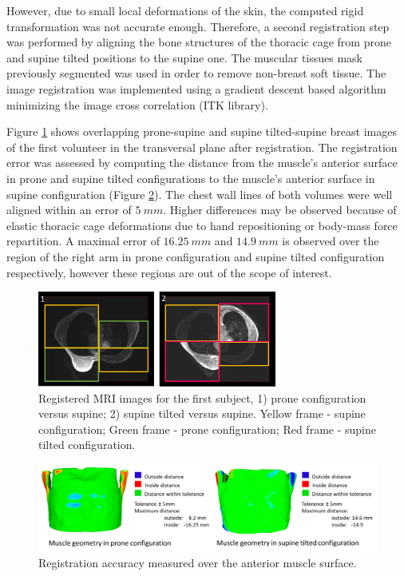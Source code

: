 However, due to small local deformations of the skin, the computed rigid transformation was not accurate enough. Therefore, a second registration step was performed by aligning the bone structures of the thoracic cage from prone and supine tilted positions to the supine one. The muscular tissues mask previously segmented was used in order to remove non-breast soft tissue. The image registration was implemented using a gradient descent based algorithm minimizing the image cross correlation (ITK library).

Figure \ref{fig:patientdataregistered} shows overlapping  prone-supine and supine tilted-supine breast images of the first volunteer in the transversal plane after registration. The registration error was assessed by computing the distance from the muscle's anterior surface in prone and supine tilted configurations to the muscle's anterior surface in supine configuration (Figure \ref{fig:volume_registration_error}). The chest wall lines of both volumes were well aligned within an error of $ 5 \ mm$. Higher differences may be observed because of elastic thoracic cage deformations due to hand repositioning or body-mass force repartition. A maximal error of $16.25 \ mm$  and $14.9\ mm$ is observed over the region of the right arm in prone configuration and supine tilted configuration respectively, however these regions are out of the scope of interest.  

\begin{figure}[!h]
\centering
\includegraphics[width=0.7\textwidth,keepaspectratio]{figures/patientDataRegisteredSubject1.png} 
\caption{Registered MRI images for the first subject, 1) prone configuration versus supine; 2) supine tilted versus supine. Yellow frame - supine configuration; Green frame - prone configuration; Red frame - supine tilted configuration.}\label{fig:patientdataregistered}
\end{figure}

\begin{figure}[!h]
\centering
\includegraphics[width=1\textwidth,keepaspectratio]{figures/volume_registration_error.png} 
\caption{Registration accuracy measured over the anterior muscle surface.}\label{fig:volume_registration_error}
\end{figure}

